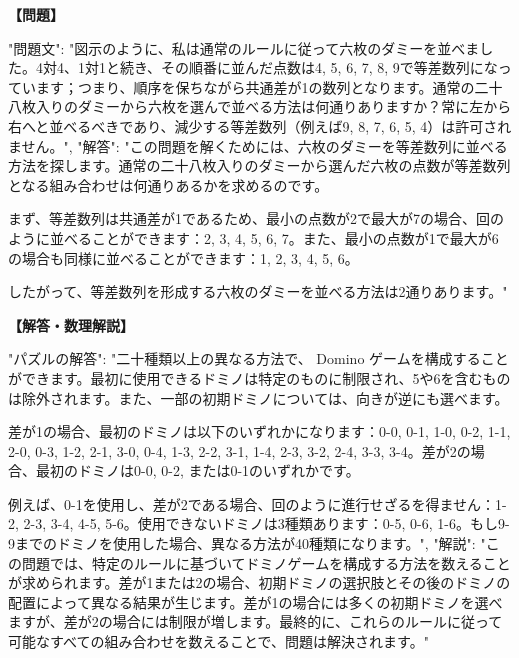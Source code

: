 \documentclass[10pt,a4paper,oneside,openany]{ltjsbook}
\begin{document}
\begin{tcolorbox}[colback=softblue,colframe=primaryblue,title=\textbf{第 378 問：DOMINOES IN PROGRESSION.},arc=2mm,boxrule=1pt,breakable]
\textbf{【問題】}\par\vspace{0.3em}
{
"問題文": "図示のように、私は通常のルールに従って六枚のダミーを並べました。4対4、1対1と続き、その順番に並んだ点数は4, 5, 6, 7, 8, 9で等差数列になっています；つまり、順序を保ちながら共通差が1の数列となります。通常の二十八枚入りのダミーから六枚を選んで並べる方法は何通りありますか？常に左から右へと並べるべきであり、減少する等差数列（例えば9, 8, 7, 6, 5, 4）は許可されません。",
"解答": "この問題を解くためには、六枚のダミーを等差数列に並べる方法を探します。通常の二十八枚入りのダミーから選んだ六枚の点数が等差数列となる組み合わせは何通りあるかを求めるのです。

まず、等差数列は共通差が1であるため、最小の点数が2で最大が7の場合、回のように並べることができます：2, 3, 4, 5, 6, 7。また、最小の点数が1で最大が6の場合も同様に並べることができます：1, 2, 3, 4, 5, 6。

したがって、等差数列を形成する六枚のダミーを並べる方法は2通りあります。"
}
\tcblower
\textbf{【解答・数理解説】}\par\vspace{0.3em}
{
"パズルの解答": "二十種類以上の異なる方法で、 Domino ゲームを構成することができます。最初に使用できるドミノは特定のものに制限され、5や6を含むものは除外されます。また、一部の初期ドミノについては、向きが逆にも選べます。

差が1の場合、最初のドミノは以下のいずれかになります：0-0, 0-1, 1-0, 0-2, 1-1, 2-0, 0-3, 1-2, 2-1, 3-0, 0-4, 1-3, 2-2, 3-1, 1-4, 2-3, 3-2, 2-4, 3-3, 3-4。差が2の場合、最初のドミノは0-0, 0-2, または0-1のいずれかです。

例えば、0-1を使用し、差が2である場合、回のように進行せざるを得ません：1-2, 2-3, 3-4, 4-5, 5-6。使用できないドミノは3種類あります：0-5, 0-6, 1-6。もし9-9までのドミノを使用した場合、異なる方法が40種類になります。",
"解説": "この問題では、特定のルールに基づいてドミノゲームを構成する方法を数えることが求められます。差が1または2の場合、初期ドミノの選択肢とその後のドミノの配置によって異なる結果が生じます。差が1の場合には多くの初期ドミノを選べますが、差が2の場合には制限が増します。最終的に、これらのルールに従って可能なすべての組み合わせを数えることで、問題は解決されます。"
}
\end{tcolorbox}
\end{document}
